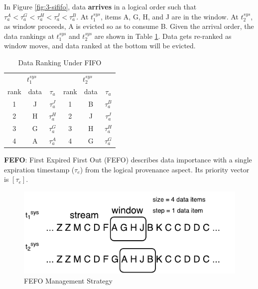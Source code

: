 In Figure \ref{fig:3-sififo}, data \textbf{arrives} in a logical order such that $\tau^{A}_{a} < \tau^{G}_{a} < \tau^{H}_{a} < \tau^{J}_{a} < \tau^{B}_{a}$.
At $t^{sys}_{1}$, items A, G, H, and J are in the window. 
At $t^{sys}_{2}$, as window proceeds, A is evicted so as to consume B. 
Given the arrival order, the data rankings at $t^{sys}_{1}$ and $t^{sys}_{2}$ are shown in Table \ref{tab:fifo}.
Data gets re-ranked as window moves, and data ranked at the bottom will be evicted.

\begin{table}[!htbp]
\centering
\caption{Data Ranking Under FIFO}
\label{tab:fifo}
\begin{tabular}{|c|c|c||c|c|c|}
\hline
\multicolumn{3}{|c||}{$t^{sys}_{1}$} & \multicolumn{3}{c|}{$t^{sys}_{2}$} \\ \hhline{|===#===|}
rank & data & $\tau_{a}$ & rank & data & $\tau_{a}$ \\ \hhline{|=|=|=#=|=|=|}
1 & J & $\tau^{J}_{a}$ & 1 & B & $\tau^{B}_{a}$ \\ \hline
2 & H & $\tau^{H}_{a}$ & 2 & J & $\tau^{J}_{a}$ \\ \hline
3 & G & $\tau^{G}_{a}$ & 3 & H & $\tau^{H}_{a}$ \\ \hline
4 & A & $\tau^{A}_{a}$ & 4 & G & $\tau^{G}_{a}$ \\ \hline
\end{tabular}
\end{table}

\textbf{FEFO}:
First Expired First Out (FEFO) describes data importance with a single expiration timestamp ($\tau_{e}$) from the logical provenance aspect. 
Its priority vector is $[\tau_{e}]$.

\begin{figure}[!htbp]
	\centering
    \includegraphics[width=5in]{img/3-sifefo.pdf}
    \caption{FEFO Management Strategy}
    \label{fig:3-sifefo}
\end{figure}

